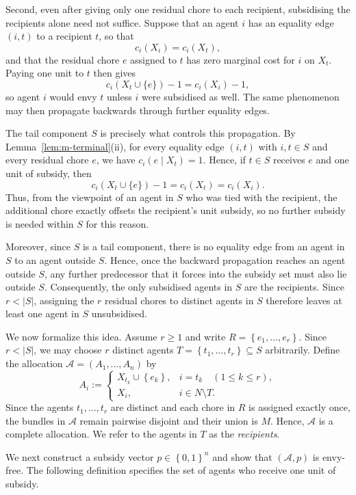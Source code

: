 \documentclass[11pt]{article}
\theoremstyle{plain}
\theoremstyle{plain}
\newcommand{\agents}{N}                       %
\newcommand{\items}{M}                        %
\newcommand{\alloc}{\mathcal{A}}              %
\newcommand{\subsidy}{p}                      %
\newcommand{\set}[1]{\left\{#1\right\}}
\newcommand{\abs}[1]{\left\lvert#1\right\rvert}
\begin{document}
Second, even after giving only one residual chore to each recipient, subsidising the recipients alone need not suffice. Suppose that an agent $i$ has an equality edge $(i,t)$ to a recipient $t$, so that
\[
c_i(X_i)=c_i(X_t),
\]
and that the residual chore $e$ assigned to $t$ has zero marginal cost for $i$ on $X_t$. Paying one unit to $t$ then gives
\[
c_i(X_t\cup\{e\})-1
   =c_i(X_i)-1,
\]
so agent $i$ would envy $t$ unless $i$ were subsidised as well. The same phenomenon may then propagate backwards through further equality edges.

The tail component $S$ is precisely what controls this propagation. By Lemma~\ref{lem:m-terminal}(ii), for every equality edge $(i,t)$ with $i,t\in S$ and every residual chore $e$, we have $c_i(e\mid X_t)=1$. Hence, if $t\in S$ receives $e$ and one unit of subsidy, then
\[
c_i(X_t\cup\{e\})-1
   =c_i(X_t)
   =c_i(X_i).
\]
Thus, from the viewpoint of an agent in $S$ who was tied with the recipient, the additional chore exactly offsets the recipient's unit subsidy, so no further subsidy is needed within $S$ for this reason.

Moreover, since $S$ is a tail component, there is no equality edge from an agent in $S$ to an agent outside $S$. Hence, once the backward propagation reaches an agent outside $S$, any further predecessor that it forces into the subsidy set must also lie outside $S$. Consequently, the only subsidised agents in $S$ are the recipients. Since $r<|S|$, assigning the $r$ residual chores to distinct agents in $S$ therefore leaves at least one agent in $S$ unsubsidised.

We now formalize this idea. Assume $r\geq 1$ and write
\(
    R=\set{e_1,\dots,e_r}.
\) Since $r<\abs S$, we may choose $r$ distinct agents \( T=\set{t_1,\dots,t_r}\subseteq S \) arbitrarily. Define the allocation $\alloc=(A_1,\dots,A_n)$ by
\begin{equation}
\label{eq:m-alloc}
  A_i :=
  \begin{cases}
    X_{t_k}\cup\set{e_k}, & i=t_k \quad (1\leq k\leq r),\\[2pt]
    X_i, & i\in\agents\setminus T.
  \end{cases}
\end{equation}
Since the agents $t_1,\dots,t_r$ are distinct and each chore in $R$ is assigned exactly once, the bundles in $\alloc$ remain pairwise disjoint and their union is $\items$. Hence, $\alloc$ is a complete allocation. We refer to the agents in $T$ as the \emph{recipients}.

We next construct a subsidy vector $\subsidy\in\set{0,1}^n$ and show that $(\alloc,\subsidy)$ is envy-free. The following definition specifies the set of agents who receive one unit of subsidy.
\end{document}
